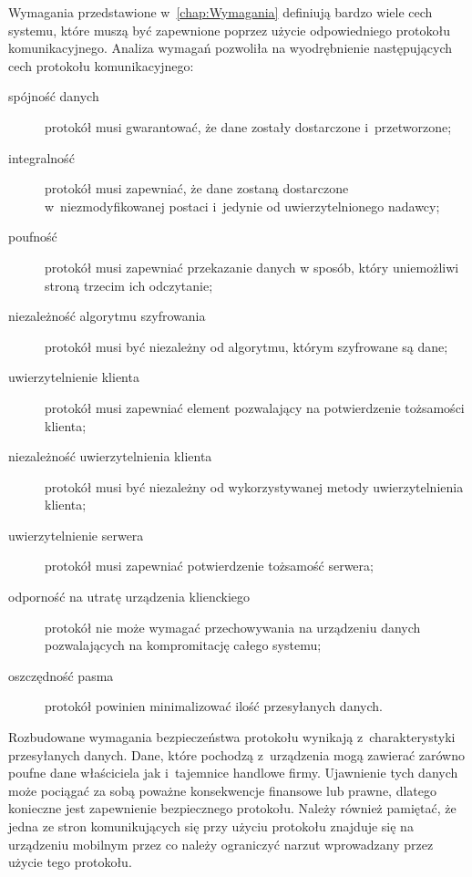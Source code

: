 Wymagania przedstawione w~\ref{chap:Wymagania} definiują bardzo wiele
cech systemu, które muszą być zapewnione poprzez użycie odpowiedniego
protokołu komunikacyjnego. Analiza wymagań pozwoliła na wyodrębnienie
następujących cech protokołu komunikacyjnego:

\begin{description}
\item[spójność danych] protokół musi gwarantować, że dane zostały
  dostarczone i~przetworzone;
\item[integralność] protokół musi zapewniać, że dane zostaną
  dostarczone w~niezmodyfikowanej postaci i~jedynie od
  uwierzytelnionego nadawcy;
\item[poufność] protokół musi zapewniać przekazanie danych w sposób,
  który uniemożliwi stroną trzecim ich odczytanie;
\item[niezależność algorytmu szyfrowania] protokół musi być niezależny
  od algorytmu, którym szyfrowane są dane;
\item[uwierzytelnienie klienta] protokół musi zapewniać element
  pozwalający na potwierdzenie tożsamości klienta;
\item[niezależność uwierzytelnienia klienta] protokół musi być
  niezależny od wykorzystywanej metody uwierzytelnienia klienta;
\item[uwierzytelnienie serwera] protokół musi zapewniać potwierdzenie
  tożsamość serwera;
\item[odporność na utratę urządzenia klienckiego] protokół nie może
  wymagać przechowywania na urządzeniu danych pozwalających na
  kompromitację całego systemu;
\item[oszczędność pasma] protokół powinien minimalizować ilość
  przesyłanych danych.
\end{description}

Rozbudowane wymagania bezpieczeństwa protokołu wynikają
z~charakterystyki przesyłanych danych. Dane, które pochodzą
z~urządzenia mogą zawierać zarówno poufne dane właściciela jak
i~tajemnice handlowe firmy. Ujawnienie tych danych może pociągać za
sobą poważne konsekwencje finansowe lub prawne, dlatego konieczne jest
zapewnienie bezpiecznego protokołu. Należy również pamiętać, że jedna
ze stron komunikujących się przy użyciu protokołu znajduje się na
urządzeniu mobilnym przez co należy ograniczyć narzut wprowadzany
przez użycie tego protokołu.

